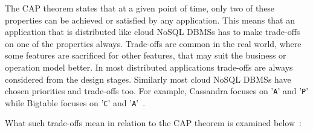 The CAP theorem states that at a given point of time,   only two of these
properties can be achieved or satisfied by any application.  This means that an
application that is distributed like cloud \ac{NoSQL} \acp{DBMS} has to make
trade-offs on one of the properties always.  Trade-offs are common in the real
world,   where some features are sacrificed for other features,   that may suit
the business or operation model better.  In most distributed applications
trade-offs are always considered from the design stages.   Similarly most cloud
\ac{NoSQL} \acp{DBMS} have chosen priorities and trade-offs too.  For example,  
Cassandra focuses on '\texttt{A}' and '\texttt{P}' while Bigtable focuses on
'\texttt{C}' and '\texttt{A}'~\citep{bigtable}.

What such trade-offs mean in relation to the CAP theorem is examined
below~\citep{abadi2,Tai,Brewer2,hp,Ramakrishnan}:

